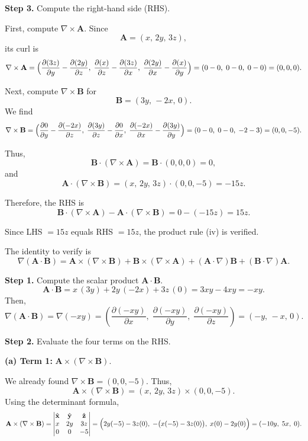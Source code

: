 \begin{hwkProblem}{1.25}{}
	\textbf{Step 3.} Compute the right-hand side (RHS).

	First, compute \(\nabla\times\mathbf{A}\). Since
	\[
		\mathbf{A} = (x,\,2y,\,3z),
	\]
	its curl is
	\[
		\nabla\times\mathbf{A} = \Bigl( \frac{\partial (3z)}{\partial y} - \frac{\partial (2y)}{\partial z},\; \frac{\partial (x)}{\partial z} - \frac{\partial (3z)}{\partial x},\; \frac{\partial (2y)}{\partial x} - \frac{\partial (x)}{\partial y} \Bigr)
		= (0-0,\; 0-0,\; 0-0) = (0,0,0).
	\]

	Next, compute \(\nabla\times\mathbf{B}\) for
	\[
		\mathbf{B} = (3y,\,-2x,\,0).
	\]
	We find
	\[
		\nabla\times\mathbf{B} = \Bigl( \frac{\partial 0}{\partial y} - \frac{\partial (-2x)}{\partial z},\; \frac{\partial (3y)}{\partial z} - \frac{\partial 0}{\partial x},\; \frac{\partial (-2x)}{\partial x} - \frac{\partial (3y)}{\partial y} \Bigr)
		= (0-0,\; 0-0,\; -2-3) = (0,0,-5).
	\]

	Thus,
	\[
		\mathbf{B}\cdot(\nabla\times\mathbf{A}) = \mathbf{B}\cdot(0,0,0)=0,
	\]
	and
	\[
		\mathbf{A}\cdot(\nabla\times\mathbf{B}) = (x,\,2y,\,3z)\cdot(0,0,-5) = -15z.
	\]

	Therefore, the RHS is
	\[
		\mathbf{B}\cdot(\nabla\times\mathbf{A}) - \mathbf{A}\cdot(\nabla\times\mathbf{B}) = 0 - (-15z) = 15z.
	\]

	Since LHS \(=15z\) equals RHS \(=15z\), the product rule (iv) is verified.



	The identity to verify is
	\[
		\nabla(\mathbf{A}\cdot\mathbf{B}) = \mathbf{A}\times(\nabla\times\mathbf{B}) + \mathbf{B}\times(\nabla\times\mathbf{A}) + (\mathbf{A}\cdot\nabla)\mathbf{B} + (\mathbf{B}\cdot\nabla)\mathbf{A}.
	\]

	\textbf{Step 1.} Compute the scalar product \(\mathbf{A}\cdot\mathbf{B}\).
	\[
		\mathbf{A}\cdot\mathbf{B} = x\,(3y) + 2y\,(-2x) + 3z\,(0) = 3xy - 4xy = -xy.
	\]
	Then,
	\[
		\nabla(\mathbf{A}\cdot\mathbf{B}) = \nabla(-xy) 
		= \left( \frac{\partial(-xy)}{\partial x},\; \frac{\partial(-xy)}{\partial y},\; \frac{\partial(-xy)}{\partial z} \right)
		= (-y,\,-x,\,0).
	\]

	\textbf{Step 2.} Evaluate the four terms on the RHS.

	\textbf{(a) Term 1:} \(\mathbf{A}\times(\nabla\times\mathbf{B})\).

	We already found \(\nabla\times\mathbf{B} = (0,0,-5)\). Thus,
	\[
		\mathbf{A}\times(\nabla\times\mathbf{B}) = (x,\,2y,\,3z) \times (0,0,-5).
	\]
	Using the determinant formula,
	\[
		\mathbf{A}\times(\nabla\times\mathbf{B}) =
		\begin{vmatrix}
			\hat{\mathbf{x}} & \hat{\mathbf{y}} & \hat{\mathbf{z}} \\
			x & 2y & 3z \\
			0 & 0 & -5
		\end{vmatrix}
		= \Bigl( 2y(-5) - 3z(0),\; -\bigl(x(-5) - 3z(0)\bigr),\; x(0) - 2y(0) \Bigr)
		= (-10y,\; 5x,\; 0).
	\]


\end{hwkProblem}
